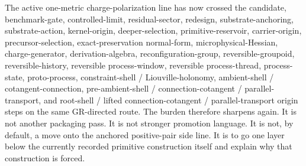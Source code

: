 \documentclass[11pt]{article}
\begin{document}
The active one-metric charge-polarization line has now crossed the candidate, benchmark-gate, controlled-limit, residual-sector, redesign, substrate-anchoring, substrate-action, kernel-origin, deeper-selection, primitive-reservoir, carrier-origin, precursor-selection, exact-preservation normal-form, microphysical-Hessian, charge-generator, derivation-algebra, reconfiguration-group, reversible-groupoid, reversible-history, reversible process-window, reversible process-thread, process-state, proto-process, constraint-shell / Liouville-holonomy, ambient-shell / cotangent-connection, pre-ambient-shell / connection-cotangent / parallel-transport, and root-shell / lifted connection-cotangent / parallel-transport origin steps on the same GR-directed route. The burden therefore sharpens again. It is not another packaging pass. It is not stronger promotion language. It is not, by default, a move onto the anchored positive-pair side line. It is to go one layer below the currently recorded primitive construction itself and explain why that construction is forced.
\end{document}
